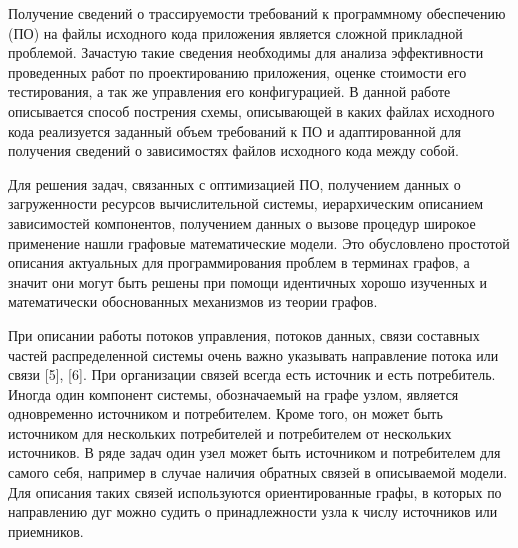 



Получение сведений о трассируемости требований к программному обеспечению (ПО) на файлы исходного кода приложения является сложной прикладной проблемой. Зачастую такие сведения необходимы для анализа эффективности проведенных работ по проектированию приложения, оценке стоимости его тестирования, а так же управления его конфигурацией. В данной работе описывается способ пострения схемы, описывающей в каких файлах исходного кода реализуется заданный объем требований к ПО и адаптированной для получения сведений о зависимостях файлов исходного кода между собой.

Для решения задач, связанных с оптимизацией ПО, получением данных о загруженности ресурсов вычислительной системы, иерархическим описанием зависимостей компонентов, получением данных о вызове процедур широкое применение нашли графовые математические модели. Это обусловлено простотой описания актуальных для программирования проблем в терминах графов, а значит они могут быть решены при помощи идентичных хорошо изученных и математически обоснованных механизмов из теории графов.

При описании работы потоков управления, потоков данных, связи составных частей распределенной системы очень важно указывать направление потока или связи [5], [6]. При организации связей всегда есть источник и есть потребитель. Иногда один компонент системы, обозначаемый на графе узлом, является одновременно источником и потребителем. Кроме того, он может быть источником для нескольких потребителей и потребителем от нескольких источников. В ряде задач один узел может быть источником и потребителем для самого себя, например в случае наличия обратных связей в описываемой модели. Для описания таких связей используются ориентированные графы, в которых по направлению дуг можно судить о принадлежности узла к числу источников или приемников.

